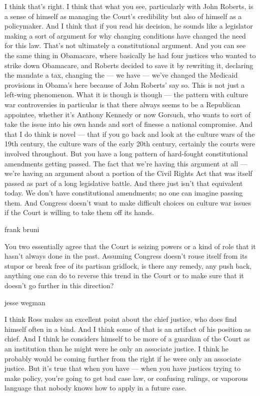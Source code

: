 I think that's right. I think that what you see, particularly with John
Roberts, is a sense of himself as managing the Court's credibility but
also of himself as a policymaker. And I think that if you read his
decision, he sounds like a legislator making a sort of argument for why
changing conditions have changed the need for this law. That's not
ultimately a constitutional argument. And you can see the same thing in
Obamacare, where basically he had four justices who wanted to strike
down Obamacare, and Roberts decided to save it by rewriting it,
declaring the mandate a tax, changing the --- we have --- we've changed
the Medicaid provisions in Obama's here because of John Roberts' say so.
This is not just a left-wing phenomenon. What it is though is though ---
the pattern with culture war controversies in particular is that there
always seems to be a Republican appointee, whether it's Anthony Kennedy
or now Gorsuch, who wants to sort of take the issue into his own hands
and sort of finesse a national compromise. And that I do think is novel
--- that if you go back and look at the culture wars of the 19th
century, the culture wars of the early 20th century, certainly the
courts were involved throughout. But you have a long pattern of
hard-fought constitutional amendments getting passed. The fact that
we're having this argument at all --- we're having an argument about a
portion of the Civil Rights Act that was itself passed as part of a long
legislative battle. And there just isn't that equivalent today. We don't
have constitutional amendments; no one can imagine passing them. And
Congress doesn't want to make difficult choices on culture war issues if
the Court is willing to take them off its hands.

frank bruni

You two essentially agree that the Court is seizing powers or a kind of
role that it hasn't always done in the past. Assuming Congress doesn't
rouse itself from its stupor or break free of its partisan gridlock, is
there any remedy, any push back, anything one can do to reverse this
trend in the Court or to make sure that it doesn't go further in this
direction?

jesse wegman

I think Ross makes an excellent point about the chief justice, who does
find himself often in a bind. And I think some of that is an artifact of
his position as chief. And I think he considers himself to be more of a
guardian of the Court as an institution than he might were he only an
associate justice. I think he probably would be coming further from the
right if he were only an associate justice. But it's true that when you
have --- when you have justices trying to make policy, you're going to
get bad case law, or confusing rulings, or vaporous language that nobody
knows how to apply in a future case.

